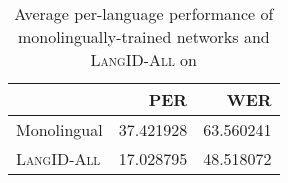 \begin{table}
\begin{tabular}{lrr}
\toprule
{} &        PER &        WER \\
\midrule
Monolingual  &  37.421928 &  63.560241 \\
\textsc{LangID-All} &  17.028795 &  48.518072 \\
\bottomrule
\end{tabular}
\caption{Average per-language performance of monolingually-trained networks and \textsc{LangID-All} on }
\end{table}
